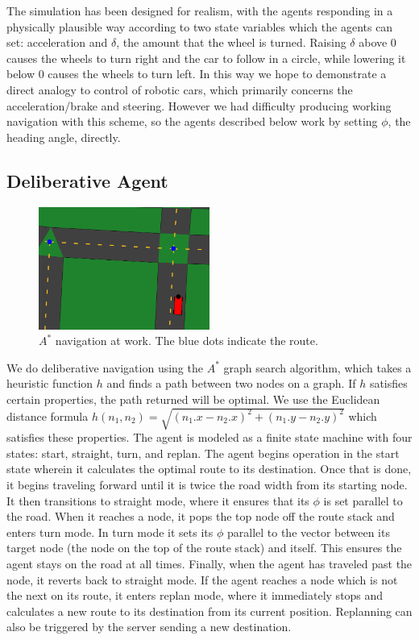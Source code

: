 \documentclass{article}
\begin{document}
The simulation has been designed for realism, with the agents
responding in a physically plausible way according to two state
variables which the agents can set: acceleration and $\delta$, the
amount that the wheel is turned. Raising $\delta$ above 0 causes the
wheels to turn right and the car to follow in a circle, while lowering
it below 0 causes the wheels to turn left. In this way we hope to
demonstrate a direct analogy to control of robotic cars, which
primarily concerns the acceleration/brake and steering. However
we had difficulty producing working navigation with this scheme, so
the agents described below work by setting $\phi$, the heading angle,
directly.


\subsection{Deliberative Agent}
\begin{figure}[h]
  \begin{center}
    \includegraphics[width=0.5\textwidth]{astar}
  \end{center}
  \caption{$A^*$ navigation at work. The blue dots indicate the route.}
  \label{astar}
\end{figure}
We do deliberative navigation using the $A^*$ graph search algorithm,
which takes a heuristic function $h$ and finds a path between two
nodes on a graph. If $h$ satisfies certain properties, the path
returned will be optimal. We use the Euclidean distance formula
$h(n_1, n_2)=\sqrt{(n_1.x - n_2.x)^2 + (n_1.y - n_2.y)^2}$ which
satisfies these properties. The agent is modeled as a finite state
machine with four states: start, straight, turn, and replan. The agent
begins operation in the start state wherein it calculates the optimal
route to its destination. Once that is done, it begins traveling
forward until it is twice the road width from its starting node. It
then transitions to straight mode, where it ensures that its $\phi$ is
set parallel to the road. When it reaches a node, it pops the top node
off the route stack and enters turn mode. In turn mode it sets its
$\phi$ parallel to the vector between its target node (the node on the
top of the route stack) and itself. This ensures the agent stays on
the road at all times. Finally, when the agent has traveled past the
node, it reverts back to straight mode. If the agent reaches a node
which is not the next on its route, it enters replan mode, where it
immediately stops and calculates a new route to its destination from
its current position. Replanning can also be triggered by the server
sending a new destination.
\end{document}
